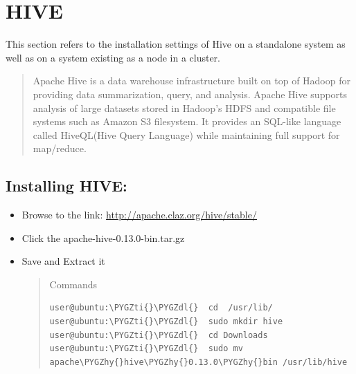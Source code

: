 \documentclass[a4paper,12pt,oneside]{sphinxmanual}
\def\PYGZdl{\char`\$}
\def\PYGZhy{\char`\-}
\def\PYGZti{\char`\~}
\begin{document}
\begin{figure}[htbp]
\centering

\end{figure}


\chapter{HIVE}
\label{document:hive}
This section refers to the installation settings of Hive on a standalone system
as well as on a system existing as a node in a cluster.
\begin{quote}

Apache Hive is a data warehouse infrastructure built on top of Hadoop for providing data summarization, query, and analysis. Apache Hive supports analysis of large datasets stored in Hadoop's HDFS and compatible file systems such as Amazon S3 filesystem. It provides an SQL-like language called HiveQL(Hive Query Language) while maintaining full support for map/reduce.
\end{quote}


\section{Installing HIVE:}
\label{document:installing-hive}\begin{itemize}
\item {} 
Browse to the link: \href{http://apache.claz.org/hive/stable/}{http://apache.claz.org/hive/stable/}

\item {} 
Click the apache-hive-0.13.0-bin.tar.gz

\item {} 
Save and Extract it
\begin{quote}

Commands

\begin{Verbatim}[commandchars=\\\{\}]
user@ubuntu:\PYGZti{}\PYGZdl{}  cd  /usr/lib/
user@ubuntu:\PYGZti{}\PYGZdl{}  sudo mkdir hive
user@ubuntu:\PYGZti{}\PYGZdl{}  cd Downloads
user@ubuntu:\PYGZti{}\PYGZdl{}  sudo mv apache\PYGZhy{}hive\PYGZhy{}0.13.0\PYGZhy{}bin /usr/lib/hive
\end{Verbatim}
\end{quote}

\end{itemize}
\end{document}

